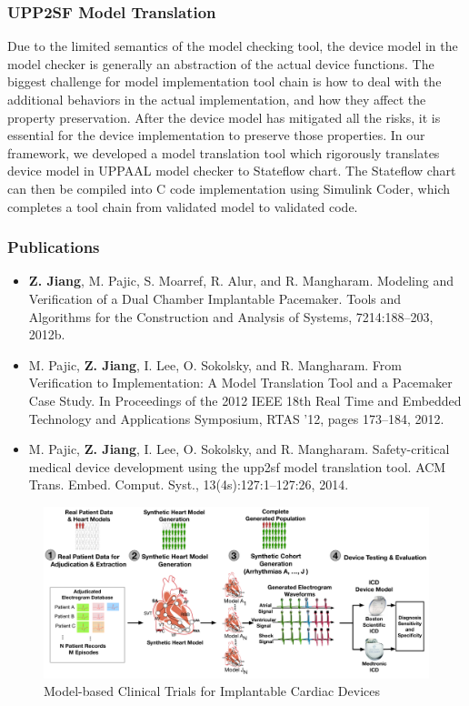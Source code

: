 \documentclass[a4paper]{article}
\begin{document}
\subsubsection{UPP2SF Model Translation}
Due to the limited semantics of the model checking tool, the device model in the model checker is generally an abstraction of the actual device functions.
The biggest challenge for model implementation tool chain is how to deal with the additional behaviors in the actual implementation, and how they affect the property preservation.
After the device model has mitigated all the risks, it is essential for the device implementation to preserve those properties.
In our framework, we developed a model translation tool which rigorously translates device model in UPPAAL model checker to Stateflow chart.
The Stateflow chart can then be compiled into C code implementation using Simulink Coder, which completes a tool chain from validated model to validated code.

\subsubsection{Publications}
\begin{itemize}
\item \textbf{Z. Jiang}, M. Pajic, S. Moarref, R. Alur, and R. Mangharam. Modeling and Verification
of a Dual Chamber Implantable Pacemaker. Tools and Algorithms for the
Construction and Analysis of Systems, 7214:188–203, 2012b.
\item M. Pajic, \textbf{Z. Jiang}, I. Lee, O. Sokolsky, and R. Mangharam. From Verification to
Implementation: A Model Translation Tool and a Pacemaker Case Study. In Proceedings
of the 2012 IEEE 18th Real Time and Embedded Technology and Applications
Symposium, RTAS ’12, pages 173–184, 2012.
\item M. Pajic, \textbf{Z. Jiang}, I. Lee, O. Sokolsky, and R. Mangharam. Safety-critical medical
device development using the upp2sf model translation tool. ACM Trans. Embed.
Comput. Syst., 13(4s):127:1–127:26, 2014.
\end{itemize}

\newpage

\begin{figure}[t]
	\centering
	\includegraphics[scale=0.25]{figs/figMBCToverview.pdf}
	\caption{\small Model-based Clinical Trials for Implantable Cardiac Devices}
	\label{fig:mbct}
\end{figure}
\end{document}
